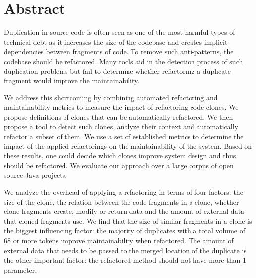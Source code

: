\chapter*{Abstract}
Duplication in source code is often seen as one of the most harmful types of technical debt as it increases the size of the codebase and creates implicit dependencies between fragments of code. To remove such anti-patterns, the codebase should be refactored. Many tools aid in the detection process of such duplication problems but fail to determine whether refactoring a duplicate fragment would improve the maintainability.

We address this shortcoming by combining automated refactoring and maintainability metrics to measure the impact of refactoring code clones. We propose definitions of clones that can be automatically refactored. We then propose a tool to detect such clones, analyze their context and automatically refactor a subset of them. We use a set of established metrics to determine the impact of the applied refactorings on the maintainability of the system. Based on these results, one could decide which clones improve system design and thus should be refactored. We evaluate our approach over a large corpus of open source Java projects.

We analyze the overhead of applying a refactoring in terms of four factors: the size of the clone, the relation between the code fragments in a clone, whether clone fragments create, modify or return data and the amount of external data that cloned fragments use. We find that the size of similar fragments in a clone is the biggest influencing factor: the majority of duplicates with a total volume of 68 or more tokens improve maintainability when refactored. The amount of external data that needs to be passed to the merged location of the duplicate is the other important factor: the refactored method should not have more than 1 parameter.
